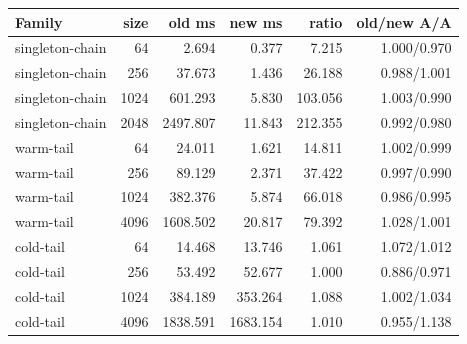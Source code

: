 \begin{center}\small
\begin{tabular}{@{}lrrrrr@{}}
\toprule
Family & size & old ms & new ms & ratio & old/new A/A \\
\midrule
singleton-chain & 64 & 2.694 & 0.377 & 7.215 & 1.000/0.970 \\
singleton-chain & 256 & 37.673 & 1.436 & 26.188 & 0.988/1.001 \\
singleton-chain & 1024 & 601.293 & 5.830 & 103.056 & 1.003/0.990 \\
singleton-chain & 2048 & 2497.807 & 11.843 & 212.355 & 0.992/0.980 \\
warm-tail & 64 & 24.011 & 1.621 & 14.811 & 1.002/0.999 \\
warm-tail & 256 & 89.129 & 2.371 & 37.422 & 0.997/0.990 \\
warm-tail & 1024 & 382.376 & 5.874 & 66.018 & 0.986/0.995 \\
warm-tail & 4096 & 1608.502 & 20.817 & 79.392 & 1.028/1.001 \\
cold-tail & 64 & 14.468 & 13.746 & 1.061 & 1.072/1.012 \\
cold-tail & 256 & 53.492 & 52.677 & 1.000 & 0.886/0.971 \\
cold-tail & 1024 & 384.189 & 353.264 & 1.088 & 1.002/1.034 \\
cold-tail & 4096 & 1838.591 & 1683.154 & 1.010 & 0.955/1.138 \\
\bottomrule
\end{tabular}
\end{center}
